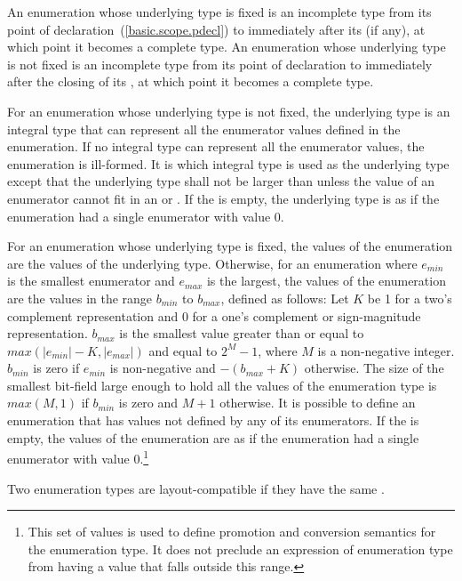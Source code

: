 \pnum
An enumeration whose underlying type is fixed is an incomplete type from its
point of declaration~(\ref{basic.scope.pdecl}) to immediately after its
 (if any), at which point it becomes a complete type.
An enumeration whose underlying type is not fixed is an incomplete type from
its point of declaration to immediately after the closing \tcode{\}} of its
, at which point it becomes a complete type.

\pnum
{}%
For an enumeration whose underlying type is not fixed,
the underlying type
is an
integral type that can represent all the enumerator values defined in
the enumeration. If no integral type can represent all the enumerator
values, the enumeration is ill-formed. It is 
which integral type is used as the underlying type 
except that the underlying type shall not be larger than 
unless the value of an enumerator cannot fit in an  or
. If the  is empty, the
underlying type is as if the enumeration had a single enumerator with
value 0.

\pnum
For an enumeration whose underlying type is fixed, the values of
the enumeration are the values of the underlying type. Otherwise,
for an enumeration where $e_\mathit{min}$ is the smallest enumerator and
$e_\mathit{max}$ is the largest, the values of the enumeration are the
values in the range $b_{min}$ to $b_{max}$, defined as follows: Let $K$
be 1 for a two's complement representation and 0 for a one's complement
or sign-magnitude representation. $b_{max}$ is the smallest value
greater than or equal to $max(|e_{min}| - K, |e_{max}|)$ and equal to
$2^M-1$, where $M$ is a non-negative integer. $b_{min}$ is zero if
$e_{min}$ is non-negative and $-(b_{max}+K)$ otherwise. The size of the
smallest bit-field large enough to hold all the values of the
enumeration type is $max(M,1)$ if $b_{min}$ is zero and $M+1$ otherwise.
It is possible to define an enumeration that has values not defined by
any of its enumerators. If the  is empty, the
values of the enumeration are as if the enumeration had a single enumerator with
value 0.\footnote{This set of values is used to define promotion and
conversion semantics for the enumeration type. It does not preclude an
expression of enumeration type from having a value that falls outside
this range.}

\pnum
{}%
Two enumeration types are layout-compatible if they have the same
.

